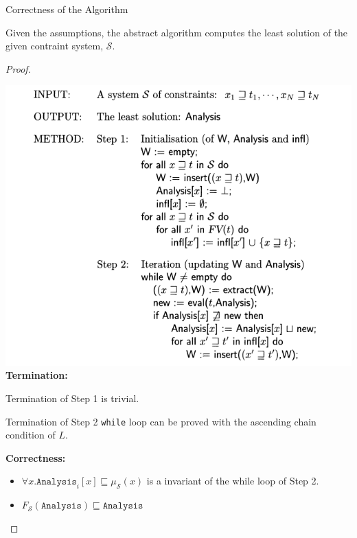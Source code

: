 \documentclass[aspectratio=1610, 13pt]{beamer}
\begin{document}
\begin{frame}{Correctness of the Algorithm}
\begin{lemma}[6.4]

Given the assumptions, the abstract algorithm computes the least solution of the given contraint system, $\mathcal{S}$.



\end{lemma}
\begin{proof}
\begin{multicols}{2}
\includegraphics[scale=0.27]{absAlgo.png}
\textbf{Termination:}

Termination of Step 1 is trivial.

Termination of Step 2 \texttt{while} loop can be proved with the ascending chain condition of $L$.

\textbf{Correctness:}

\begin{itemize}
\item $\forall x. \texttt{Analysis}_i[x] \sqsubseteq \mu_{\mathcal{S}}(x)$ is a invariant of the while loop of Step 2.

\item ${F}_{\mathcal{S}}(\texttt{Analysis}) \sqsubseteq  \texttt{Analysis}$
\end{itemize}

\end{multicols}
\end{proof}
\end{frame}
\end{document}
